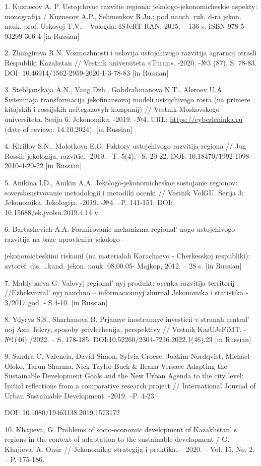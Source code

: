 \begin{noparindent}
1. Kuznecov A. P. Ustojchivoe razvitie regiona: jekologo-jekonomicheskie
aspekty: monografija / Kuznecov A.P., Selimenkov R.Ju.; pod nauch. ruk.
d-ra jekon. nauk, prof. Uskovoj T.V. -- Vologda: ISJeRT RAN, 2015. --
136 s. ISBN 978-5-93299-306-4 {[}in Russian{]}

2. Zhangirova R.N. Vozmozhnosti i uslovija ustojchivogo razvitija
agrarnoj otrasli Respubliki Kazahstan // Vestnik universiteta «Turan».
-2020. -№3 (87). S. 78-83. DOI: 10.46914/1562-2959-2020-1-3-78-83 {[}in
Russian{]}

3. Stebljanskaja A.N., Vang Dzh., Gabdrahmanova N.T., Aleroev U.A.
Sistemnaja transformacija jekofinansovoj modeli ustojchivogo rosta (na
primere kitajskih i rossijskih neftegazovyh kompanij) // Vestnik
Moskovskogo universiteta. Serija 6. Jekonomika. -2019. -№4. URL:
\href{https://cyberleninka.ru/article/n/sistemnaya-transformatsiya-ekofinansovoy-modeli-ustoychivogo-rosta-na-primere-kitayskih-i-rossiyskih-neftegazovyh-kompaniy}{https://cyberleninka.ru}
(date of review:: 14.10.2024). {[}in Russian{]}

4. Kirillov S.N., Molotkova E.G. Faktory ustojchivogo razvitija regiona
// Jug Rossii: jekologija, razvitie. -2010. --T. 5(4). --S. 20-22. DOI:
10.18470/1992-1098-2010-4-20-22 {[}in Russian{]}

5. Anikina I.D., Anikin A.A. Jekologo-jekonomicheskoe sostojanie
regionov: sovershenstvovanie metodologii i metodiki ocenki // Vestnik
VolGU. Serija 3: Jekonomika. Jekologija. -2019. -№4. --P. 141-151. DOI:
10.15688/ek.jvolsu.2019.4.14 v

6. Bartashevich A.A. Formirovanie mehanizma
regional' nogo ustojchivogo razvitija na baze upravlenija
jekologo -

jekonomicheskimi riskami (na materialah Karachaevo -
Cherkesskoj respubliki): avtoref. dis. \ldots kand. jekon. nauk:
08.00.05- Majkop, 2012. -- 28 s. {[}in Russian{]}

7. Maldybaeva G. Valovyj regional' nyj produkt: ocenka
razvitija territorij //Ezhekvartal' nyj nauchno --
informacionnyj zhurnal Jekonomika i statistika - 3/2017 god. - S.4-10.
{[}in Russian{]}

8. Ydyrys S.S., Sharhanova B. Prjamye inostrannye investicii v stranah
central' noj Azii: lidery, sposoby privlechenija,
perspektivy // Vestnik KazUJeFiMT. -№1(46) /2022. -- S. 178-185.
DOI:10.52260/2304-7216.2022.1(46).23 {[}in Russian{]}

9. Sandra C. Valencia, David Simon, Sylvia Croese, Joakim Nordqvist,
Michael Oloko, Tarun Sharma, Nick Taylor Buck \& Ileana Versace Adapting
the Sustainable Development Goals and the New Urban Agenda to the city
level: Initial reflections from a comparative research project //
International Journal of Urban Sustainable Development. -2019. --P.
4-23.

DOI: 10.1080/19463138.2019.1573172

10. Khajieva, G. Problems of socio-economic development of
Kazakhstan' s regions in the context of adaptation to the
sustainable development / G. Khajieva, A. Omir // Jekonomika: strategija
i praktika. -- 2020. -- Vol. 15, No. 2. -- P. 175-186.
\end{noparindent}

